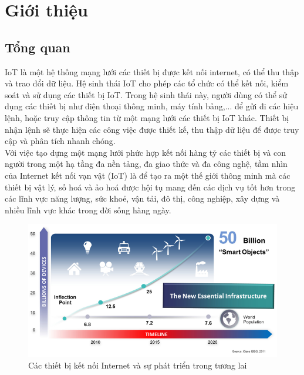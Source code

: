 \documentclass{report}
\begin{document}
\newpage
\listoffigures

\newpage
\listoftables
\newpage
\chapter{Giới thiệu}
\section{Tổng quan}
IoT là một hệ thống mạng lưới các thiết bị được kết nối internet, có thể thu thập và trao đổi
dữ liệu. Hệ sinh thái IoT cho phép các tổ chức có thể kết nối, kiểm soát và sử dụng các thiết
bị IoT. Trong hệ sinh thái này, người dùng có thể sử dụng các thiết bị như điện thoại thông
minh, máy tính bảng,... để gửi đi các hiệu lệnh, hoặc truy cập thông tin từ một mạng lưới các
thiết bị IoT khác. Thiết bị nhận lệnh sẽ thực hiện các công việc được thiết kế, thu thập dữ
liệu để được truy cập và phân tích nhanh chóng. \\ 

Với việc tạo dựng một mạng lưới phức hợp kết nối hàng tỷ các thiết bị và con người
trong một hạ tầng đa nền tảng, đa giao thức và đa công nghệ, tầm nhìn của Internet
kết nối vạn vật (IoT) là để tạo ra một thế giới thông minh mà các thiết bị vật lý, số
hoá và ảo hoá được hội tụ mang đến các dịch vụ tốt hơn trong các lĩnh vực năng
lượng, sức khoẻ, vận tải, đô thị, công nghiệp, xây dựng và nhiều lĩnh vực khác trong
đời sống hàng ngày. 
\begin{figure}[h]
	\centering
	\includegraphics[scale = 0.5]{fig1.png}
	\caption{Các thiết bị kết nối Internet và sự phát triển trong tương lai}
	\label{fig:Graph1}
\end{figure}
\end{document}
